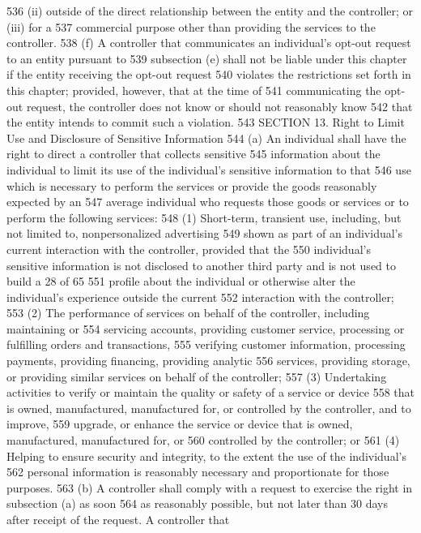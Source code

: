 536 (ii) outside of the direct relationship between the entity and the controller; or (iii) for a
537 commercial purpose other than providing the services to the controller.
538 (f) A controller that communicates an individual’s opt-out request to an entity pursuant to
539 subsection (e) shall not be liable under this chapter if the entity receiving the opt-out request
540 violates the restrictions set forth in this chapter; provided, however, that at the time of
541 communicating the opt-out request, the controller does not know or should not reasonably know
542 that the entity intends to commit such a violation.
543 SECTION 13. Right to Limit Use and Disclosure of Sensitive Information
544 (a) An individual shall have the right to direct a controller that collects sensitive
545 information about the individual to limit its use of the individual’s sensitive information to that
546 use which is necessary to perform the services or provide the goods reasonably expected by an
547 average individual who requests those goods or services or to perform the following services:
548 (1) Short-term, transient use, including, but not limited to, nonpersonalized advertising
549 shown as part of an individual’s current interaction with the controller, provided that the
550 individual’s sensitive information is not disclosed to another third party and is not used to build a
28 of 65
551 profile about the individual or otherwise alter the individual’s experience outside the current
552 interaction with the controller;
553 (2) The performance of services on behalf of the controller, including maintaining or
554 servicing accounts, providing customer service, processing or fulfilling orders and transactions,
555 verifying customer information, processing payments, providing financing, providing analytic
556 services, providing storage, or providing similar services on behalf of the controller;
557 (3) Undertaking activities to verify or maintain the quality or safety of a service or device
558 that is owned, manufactured, manufactured for, or controlled by the controller, and to improve,
559 upgrade, or enhance the service or device that is owned, manufactured, manufactured for, or
560 controlled by the controller; or
561 (4) Helping to ensure security and integrity, to the extent the use of the individual’s
562 personal information is reasonably necessary and proportionate for those purposes.
563 (b) A controller shall comply with a request to exercise the right in subsection (a) as soon
564 as reasonably possible, but not later than 30 days after receipt of the request. A controller that
